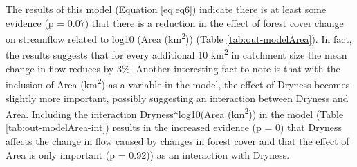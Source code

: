 \documentclass[]{elsarticle} %
\begin{document}
The results of this model (Equation \eqref{eq:eq6}) indicate there is at least some evidence (p = 0.07) that there is a reduction in the effect of forest cover change on streamflow related to log10 (Area (km\textsuperscript{2})) (Table \ref{tab:out-modelArea}). In fact, the results suggests that for every additional 10 km\textsuperscript{2} in catchment size the mean change in flow reduces by 3\%. Another interesting fact to note is that with the inclusion of Area (km\textsuperscript{2}) as a variable in the model, the effect of Dryness becomes slightly more important, possibly suggesting an interaction between Dryness and Area. Including the interaction Dryness*log10(Area (km\textsuperscript{2})) in the model (Table \ref{tab:out-modelArea-int}) results in the increased evidence (p = 0) that Dryness affects the change in flow caused by changes in forest cover and that the effect of Area is only important (p = 0.92)) as an interaction with Dryness.
\end{document}
